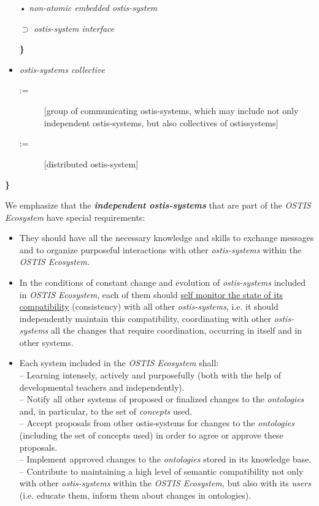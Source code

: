 \documentclass[a4paper,10pt]{article}
\begin{document}
\begin{multicols}{2}
\begin{itemize}
 


\hspace{0.6cm} • \textit{non-atomic embedded ostis-system}


\hspace{0.9cm} $\supset$ \textit{ostis-system interface} 

\hspace{0.6cm}\textbf{\}}

  \item \textit{ostis-systems collective}
  \begin{description}
        \item[:=][group of communicating ostis-systems,
which may include not only independent
ostis-systems, but also collectives of ostissystems]
        \item[:=] [distributed ostis-system]
    \end{description}





\end{itemize}


\hspace{-0.2cm}\textbf{\}}


We emphasize that the \textbf{\textit{independent ostis-systems}} that
are part of the \textit{OSTIS Ecosystem} have special requirements:
\begin{itemize}
    \item They should have all the necessary knowledge and
skills to exchange messages and to organize purposeful interactions with other \textit{ostis-systems} within the
\textit{OSTIS Ecosystem.}
   \item In the conditions of constant change and evolution of \textit{ostis-systems} included in \textit{OSTIS Ecosystem},
each of them should \underline{self monitor the state of
its compatibility} (consistency) with all other \textit{ostis-systems}, i.e. it should independently maintain this
compatibility, coordinating with other \textit{ostis-systems}
all the changes that require coordination, occurring
in itself and in other systems.
     \item Each system included in the \textit{OSTIS Ecosystem} shall: \\
– Learning intensely, actively and purposefully
(both with the help of developmental teachers and
independently).\\
– Notify all other systems of proposed or finalized
changes to the \textit{ontologies} and, in particular, to the
set of \textit{concepts} used.\\
– Accept proposals from other ostis-systems for
changes to the \textit{ontologies} (including the set of
concepts used) in order to agree or approve these
proposals.\\
– Implement approved changes to the \textit{ontologies}
stored in its knowledge base.\\
– Contribute to maintaining a high level of semantic compatibility not only with other \textit{ostis-systems} within the \textit{OSTIS Ecosystem}, but also
with its \textit{users} (i.e. educate them, inform them
about changes in ontologies).
\end{itemize}



\end{multicols}
\end{document}
